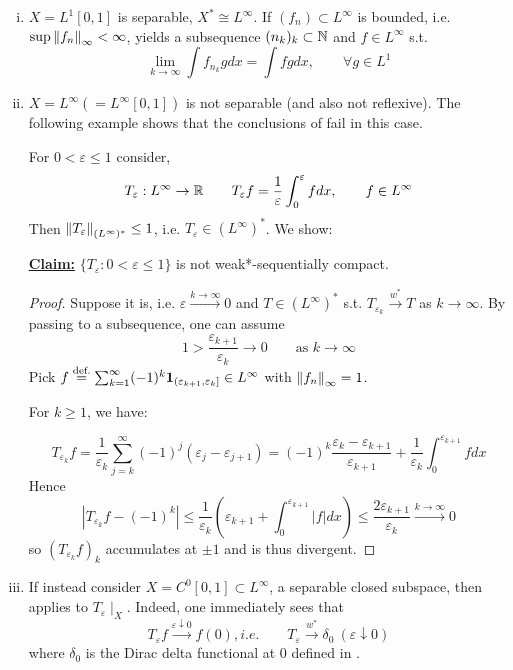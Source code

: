 \documentclass{article}
\begin{document}
\begin{example}
    \begin{enumerate}[i)]
        \item $X = L^1[0,1]$ is separable, $X^* \cong L^{\infty}$.
        If $(f_n) \subset L^{\infty}$ is bounded, i.e. $\sup \left\|{f_n}\right\|_\infty < \infty$,  yields a subsequence $(n_k)_k \subset \mathbb{N}$ and $f\in L^{\infty}$ s.t.  
        $$
        \lim_{k \to \infty} \int f_{n_k}g dx = \int fg dx, \qquad \forall g\in L^1
        $$
        \item $X = L^{\infty}(=L^{\infty}[0,1])$ is not separable (and also not reflexive). The following example shows that the conclusions of  fail in this case. 
        
        For $0<\varepsilon\leq 1$ consider,  
        $$
        T_{\varepsilon}:L^{\infty} \to \mathbb{R} \qquad T_\varepsilon f = \frac{1}{\varepsilon} \int_0^{\varepsilon} f dx, \qquad f\in L^{\infty}
        $$  
        Then $\left\|{T_\varepsilon}\right\|_{(L^{\infty})^*}\leq 1$, i.e. $T_\varepsilon \in (L^\infty)^*$. We show:  

        \textbf{\underline{Claim:}} $\{T_\varepsilon: 0< \varepsilon \leq 1\}$ is not weak*-sequentially compact.  
        \begin{proof}
            Suppose it is, i.e. $\varepsilon \overset{k  \to \infty}{\longrightarrow} 0$ and $T \in (L^{\infty})^*$ s.t. $T_{\varepsilon_k} \overset{w^*}{\longrightarrow} T$ as $k\to \infty$. By passing to a subsequence, one can assume  
            $$
            1 > \frac{\varepsilon_{k+1}}{\varepsilon_{k}} \to 0 \qquad \text{as\ } k\to \infty
            $$
            Pick $f\stackrel{\text{def.}}{=} \sum_{k=1}^{\infty}(-1)^k \mathbf{1}_{(\varepsilon_{k+1}, \varepsilon_k]} \in L^{\infty}$ with $\left\|{f_n}\right\|_\infty=1$.  

            For $k\geq 1$, we have:  

            $$
            T_{\varepsilon_k}f = \frac{1}{\varepsilon_k} \sum_{j=k}^{\infty} (-1)^j (\varepsilon_j - \varepsilon_{j+1}) = (-1)^k \frac{\varepsilon_k - \varepsilon_{k+1}}{\varepsilon_{k+1}} +\frac{1}{\varepsilon_k} \int_0^{\varepsilon_{k+1}} f dx
            $$  
            Hence  
            $$
            |T_{\varepsilon_k}f-(-1)^{k}| \leq \frac{1}{\varepsilon_k} \left(\varepsilon_{k+1} + \int_0^{\varepsilon_{k+1}} |f| dx\right) \leq \frac{2\varepsilon_{k+1}}{\varepsilon_k} \overset{k\to \infty}{\longrightarrow} 0
            $$  
            so $(T_{\varepsilon_k} f)_k$ accumulates at $\pm 1$ and is thus divergent.
        \end{proof}

    \item If instead consider $X = C^0[0,1]\subset L^{\infty}$, a separable closed subspace, then  applies to $T_\varepsilon \mid_X$. Indeed, one immediately sees that  
    $$
    T_\varepsilon f \overset{\varepsilon \downarrow 0}{\longrightarrow} f(0), i.e. \qquad T_\varepsilon \overset{w^*}{\rightarrow} \delta_0 \ (\varepsilon \downarrow 0)
    $$
    where $\delta_0$ is the Dirac delta functional at $0$ defined in .
    \end{enumerate}
\end{example}
\end{document}

